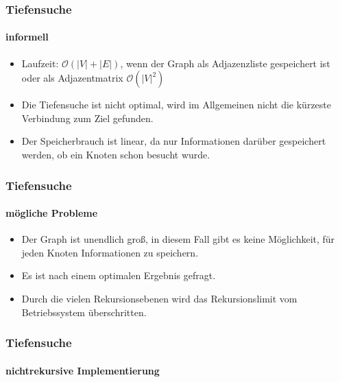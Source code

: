 
\begin{frame}
	\frametitle{Tiefensuche}
	\framesubtitle{informell}
	\begin{itemize}
		\item Laufzeit: $\mathcal{O}(|V| + |E|)$, wenn der Graph als Adjazenzliste gespeichert ist oder als Adjazentmatrix $\mathcal{O}(|V|^2)$
		\item Die Tiefensuche ist nicht optimal, wird im Allgemeinen nicht die kürzeste Verbindung zum Ziel gefunden.
		\item Der Speicherbrauch ist linear, da nur Informationen darüber gespeichert werden, ob ein Knoten schon besucht wurde.
	\end{itemize}
\end{frame}

\begin{frame}
		\frametitle{Tiefensuche}
		\framesubtitle{mögliche Probleme}
		\begin{itemize}
			\item Der Graph ist unendlich groß, in diesem Fall gibt es keine Möglichkeit, für jeden Knoten Informationen zu speichern.
			\item Es ist nach einem optimalen Ergebnis gefragt.
			\item Durch die vielen Rekursionsebenen wird das Rekursionslimit vom Betriebssystem überschritten.
		\end{itemize}
\end{frame}

\begin{frame}
	\frametitle{Tiefensuche}
	\framesubtitle{nichtrekursive Implementierung}
	
\end{frame}

